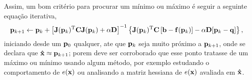 \begin{myproofT}
Assim, um bom critério para procurar um mínimo ou máximo é seguir a seguinte 
equação iterativa,
\begin{equation}\label{eq:proof:minfxbCfxbaxqd3}
 \VECTOR{p}_{k+1} \leftarrow \VECTOR{p}_{k} +
\left[ \MATRIX{J}(\VECTOR{p}_{k})^{\transpose}\MATRIX{C} \MATRIX{J}(\VECTOR{p}_{k})+\alpha \MATRIX{D} \right]^{-1}
\left\{ \MATRIX{J}(\VECTOR{p}_{k})^{\transpose}\MATRIX{C} \left[\VECTOR{b}-\VECTOR{f}(\VECTOR{p}_{k})\right]-\alpha\MATRIX{D}[\VECTOR{p}_{k}-\VECTOR{q}]\right\},
\end{equation}
iniciando desde um $\VECTOR{p}_{0}$ qualquer, ate que $\VECTOR{p}_{k}$ seja muito próximo a $\VECTOR{p}_{k+1}$,
onde se declara que $\VECTOR{\hat{x}} \approx \VECTOR{p}_{k+1}$; porem deve ser corroborado
que esse ponto tratasse de um máximo ou mínimo usando algum método, por exemplo estudando o comportamento 
de $e(\VECTOR{x})$ ou analisando a matriz hessiana de $e(\VECTOR{x})$ avaliada em $\VECTOR{\hat{x}}$.
\end{myproofT}

